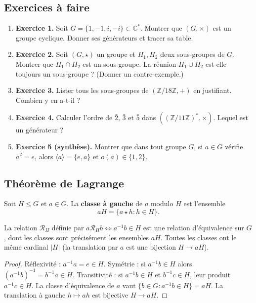 \subsection{Exercices à faire}
\begin{enumerate}
    \item \textbf{Exercice 1.} Soit $G = \{1, -1, i, -i\} \subset \mathbb{C}^*$. Montrer que $(G, \times)$ est un groupe cyclique. Donner ses générateurs et tracer sa table.
    \item \textbf{Exercice 2.} Soit $(G, \star)$ un groupe et $H_1, H_2$ deux sous-groupes de $G$. Montrer que $H_1 \cap H_2$ est un sous-groupe. La réunion $H_1 \cup H_2$ est-elle toujours un sous-groupe ? (Donner un contre-exemple.)
    \item \textbf{Exercice 3.} Lister tous les sous-groupes de $(\mathbb{Z}/18\mathbb{Z}, +)$ en justifiant. Combien y en a-t-il ?
    \item \textbf{Exercice 4.} Calculer l'ordre de $\bar{2}$, $\bar{3}$ et $\bar{5}$ dans $((\mathbb{Z}/11\mathbb{Z})^*, \times)$. Lequel est un générateur ?
    \item \textbf{Exercice 5 (synthèse).} Montrer que dans tout groupe $G$, si $a \in G$ vérifie $a^2 = e$, alors $\langle a \rangle = \{e, a\}$ et $o(a) \in \{1, 2\}$.
\end{enumerate}

\subsection{Théorème de Lagrange}

\begin{definition}
Soit $H \le G$ et $a \in G$. La \textbf{classe à gauche} de $a$ modulo $H$ est l'ensemble
\[ aH = \{a \star h : h \in H\}. \]
\end{definition}

\begin{proposition}
La relation $\mathcal{R}_H$ définie par $a \mathcal{R}_H b \iff a^{-1}b \in H$ est une relation d'équivalence sur $G$, dont les classes sont précisément les ensembles $aH$. Toutes les classes ont le même cardinal $|H|$ (la translation par $a$ est une bijection $H \to aH$).
\end{proposition}

\begin{proof}
Réflexivité : $a^{-1}a = e \in H$. Symétrie : si $a^{-1}b \in H$ alors $(a^{-1}b)^{-1} = b^{-1}a \in H$. Transitivité : si $a^{-1}b \in H$ et $b^{-1}c \in H$, leur produit $a^{-1}c \in H$. La classe d'équivalence de $a$ vaut $\{b \in G : a^{-1}b \in H\} = a H$. La translation à gauche $h \mapsto ah$ est bijective $H \to aH$.
\end{proof}

